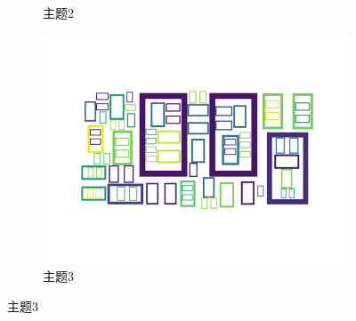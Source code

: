 \documentclass[UTF8,a4paper,15pt,titlepage,oneside]{ctexbook}
\begin{document}
\begin{figure}[htbp]
\begin{subfigure}{0.32\textwidth}
      \caption{主题2}
    \end{subfigure}
    \hfill
    \begin{subfigure}{0.32\textwidth}
      \includegraphics[width=\linewidth]{pictures/28.png}
      \caption{主题3}
    \end{subfigure}
    \vspace{0.2em} %
    


\end{figure}
\end{document}
